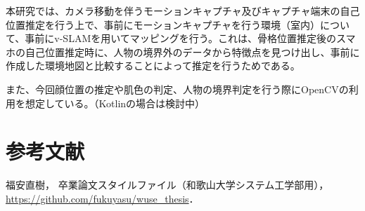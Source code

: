 \documentclass[11pt]{jreport}
\begin{document}
本研究では、カメラ移動を伴うモーションキャプチャ及びキャプチャ端末の自己位置推定を行う上で、事前にモーションキャプチャを行う環境（室内）について、事前にv-SLAMを用いてマッピングを行う。これは、骨格位置推定後のスマホの自己位置推定時に、人物の境界外のデータから特徴点を見つけ出し、事前に作成した環境地図と比較することによって推定を行うためである。

また、今回顔位置の推定や肌色の判定、人物の境界判定を行う際にOpenCVの利用を想定している。（Kotlinの場合は検討中）

\chapter{参考文献}





\begin{thebibliography}{99}

  福安直樹，
  卒業論文スタイルファイル（和歌山大学システム工学部用），\\
  \url{https://github.com/fukuyasu/wuse_thesis}．


\end{thebibliography}


% 
% 
% 

\end{document}
